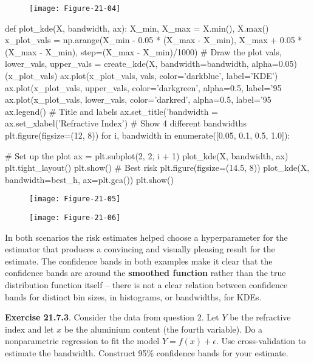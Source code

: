 \begin{figure}[H]
\centering
\texttt{[image: Figure-21-04]}
\end{figure}


\begin{python}
def plot_kde(X, bandwidth, ax):
    X_min, X_max = X.min(), X.max()
    x_plot_vals = np.arange(X_min - 0.05 * (X_max - X_min), 
                            X_max + 0.05 * (X_max - X_min), 
                            step=(X_max - X_min)/1000)
    # Draw the plot
    vals, lower_vals, upper_vals = create_kde(X, bandwidth=bandwidth, alpha=0.05)(x_plot_vals)
    ax.plot(x_plot_vals, vals, color='darkblue', label='KDE')
    ax.plot(x_plot_vals, upper_vals, color='darkgreen', 
            alpha=0.5, label='95%
    ax.plot(x_plot_vals, lower_vals, color='darkred', 
            alpha=0.5, label='95%
    ax.legend()
    # Title and labels
    ax.set_title('bandwidth = %
    ax.set_xlabel('Refractive Index')    
# Show 4 different bandwidths
plt.figure(figsize=(12, 8))
for i, bandwidth in enumerate([0.05, 0.1, 0.5, 1.0]):
    
    # Set up the plot
    ax = plt.subplot(2, 2, i + 1)
    plot_kde(X, bandwidth, ax)
plt.tight_layout()
plt.show()
# Best risk
plt.figure(figsize=(14.5, 8))
plot_kde(X, bandwidth=best_h, ax=plt.gca())
plt.show()
\end{python}

\begin{figure}[H]
\centering
\texttt{[image: Figure-21-05]}
\end{figure}

\begin{figure}[H]
\centering
\texttt{[image: Figure-21-06]}
\end{figure}

In both scenarios the risk estimates helped choose a hyperparameter for
the estimator that produces a convincing and visually pleasing result
for the estimate.
The confidence bands in both examples make it clear that the confidence
bands are around the \textbf{smoothed function} rather than the true
distribution function itself -- there is not a clear relation between
confidence bands for distinct bin sizes, in histograms, or bandwidths,
for KDEs.

\textbf{Exercise 21.7.3}. Consider the data from question 2. Let \(Y\)
be the refractive index and let \(x\) be the aluminium content (the
fourth variable). Do a nonparametric regression to fit the model
\(Y = f(x) + \epsilon\). Use cross-validation to estimate the bandwidth.
Construct 95\% confidence bands for your estimate.

